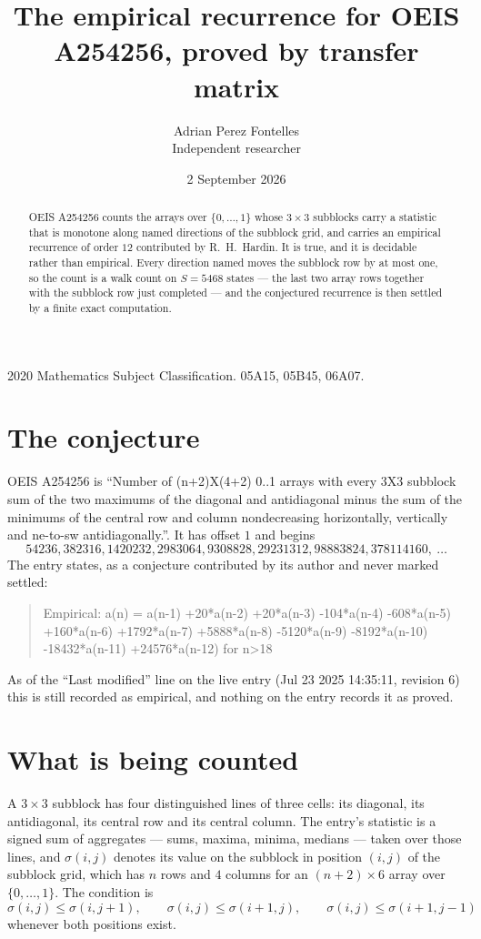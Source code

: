 \documentclass[11pt,a4paper]{article}
\title{The empirical recurrence for OEIS A254256, proved by transfer matrix}
\author{Adrian Perez Fontelles\\ \small Independent researcher}
\date{2 September 2026}
\theoremstyle{plain}
\theoremstyle{definition}
\begin{document}
\maketitle

\begin{abstract}
OEIS A254256 counts the arrays over $\{0,\dots,1\}$ whose $3\times3$ subblocks carry a
statistic that is monotone along named directions of the subblock grid, and carries an
empirical recurrence of order $12$ contributed by R.~H.~Hardin. It is true, and it is
decidable rather than empirical. Every direction named moves the subblock row by at most one,
so the count is a walk count on $S=5468$ states --- the last two array rows together with the
subblock row just completed --- and the conjectured recurrence is then settled by a finite
exact computation.
\end{abstract}

\noindent\small 2020 Mathematics Subject Classification. 05A15, 05B45, 06A07.\normalsize

\section{The conjecture}

OEIS A254256 is ``Number of (n+2)X(4+2) 0..1 arrays with every 3X3 subblock sum of the two maximums of the diagonal and antidiagonal minus the sum of the minimums of the central row and column nondecreasing horizontally, vertically and ne-to-sw antidiagonally.''. It has offset $1$ and begins
\[
54236, 382316, 1420232, 2983064, 9308828, 29231312, 98883824, 378114160,\ \dots
\]
The entry states, as a conjecture contributed by its author and never marked settled:
\begin{quote}
Empirical: a(n) = a(n-1) +20*a(n-2) +20*a(n-3) -104*a(n-4) -608*a(n-5) +160*a(n-6) +1792*a(n-7) +5888*a(n-8) -5120*a(n-9) -8192*a(n-10) -18432*a(n-11) +24576*a(n-12) for n>18
\end{quote}
As of the ``Last modified'' line on the live entry (Jul 23 2025 14:35:11, revision 6) this is still
recorded as empirical, and nothing on the entry records it as proved.

\section{What is being counted}

A $3\times3$ subblock has four distinguished lines of three cells: its diagonal, its
antidiagonal, its central row and its central column. The entry's statistic is a signed sum of
aggregates --- sums, maxima, minima, medians --- taken over those lines, and $\sigma(i,j)$
denotes its value on the subblock in position $(i,j)$ of the subblock grid, which has $n$ rows
and $4$ columns for an $(n+2)\times6$ array over $\{0,\dots,1\}$. The condition is
\[
\sigma(i,j)\le\sigma(i,j+1),\qquad \sigma(i,j)\le\sigma(i+1,j),\qquad \sigma(i,j)\le\sigma(i+1,j-1)
\]
whenever both positions exist.
\end{document}
